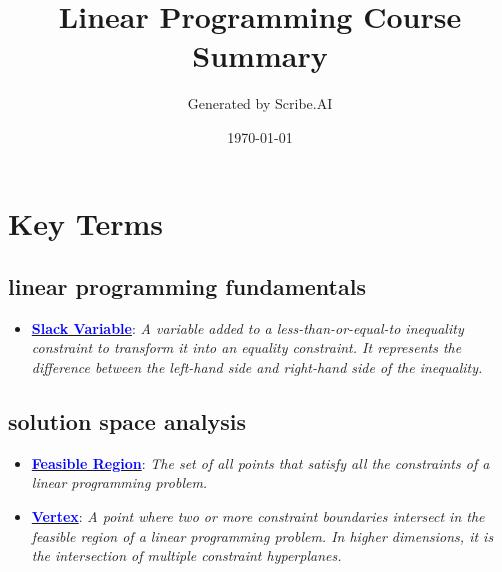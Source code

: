 \documentclass{article}%
\title{Linear Programming Course Summary}%
\author{Generated by Scribe.AI}%
\date{\today}%
\begin{document}
%
\normalsize%
\maketitle%
\section{Key Terms}%
\label{sec:KeyTerms}%
\begin{itemize}[leftmargin=*]%
\subsection{linear programming fundamentals}%
\label{subsec:linearprogrammingfundamentals}%
\begin{itemize}[leftmargin=*]%
\item \href{https://www.math.purdue.edu/~yipn/421/2024-08-27-ExSimplex.pdf#page=1}{\textbf{\textcolor{blue}{Slack Variable}}}: \emph{A variable added to a less-than-or-equal-to inequality constraint to transform it into an equality constraint. It represents the difference between the left-hand side and right-hand side of the inequality.}%
\end{itemize}

%
\subsection{solution space analysis}%
\label{subsec:solutionspaceanalysis}%
\begin{itemize}[leftmargin=*]%
\item \href{https://www.math.purdue.edu/~yipn/421/2024-08-27-ExSimplex.pdf#page=4}{\textbf{\textcolor{blue}{Feasible Region}}}: \emph{The set of all points that satisfy all the constraints of a linear programming problem.}%
\item \href{https://www.math.purdue.edu/~yipn/421/2024-08-27-ExSimplex.pdf#page=5}{\textbf{\textcolor{blue}{Vertex}}}: \emph{A point where two or more constraint boundaries intersect in the feasible region of a linear programming problem. In higher dimensions, it is the intersection of multiple constraint hyperplanes.}%
\end{itemize}

%

\end{itemize}
\end{document}
